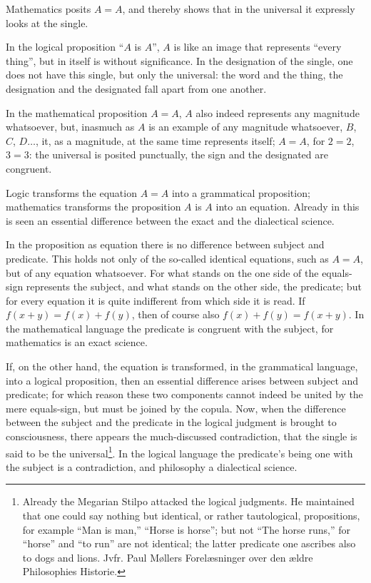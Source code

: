 \documentclass[12pt]{book}
\begin{document}
Mathematics posits $A = A$, and thereby shows that in the universal it expressly
looks at the single.

In the logical proposition ``$A$ is $A$'', $A$ is like an image that represents
``every thing'', but in itself is without significance. In the designation of the
single, one does not have this single, but only the universal: the word and the
thing, the designation and the designated fall apart from one another.

In the mathematical proposition $A = A$, $A$ also indeed represents any magnitude
whatsoever, but, inasmuch as $A$ is an example of any magnitude whatsoever, $B$,
$C$, $D\ldots$, it, as a magnitude, at the same time represents itself; $A = A$,
for $2 = 2$, $3 = 3$: the universal is posited punctually, the sign and the
designated are congruent.

Logic transforms the equation $A = A$ into a grammatical proposition;
mathematics transforms the proposition $A$ is $A$ into an equation. Already in
this is seen an essential difference between the exact and the dialectical
science.

In the proposition as equation there is no difference between subject and
predicate. This holds not only of the so-called identical equations, such as
$A = A$, but of any equation whatsoever. For what stands on the one side of the
equals-sign represents the subject, and what
stands on the other side, the predicate; but for every equation it is quite
indifferent from which side it is read. If $f(x+y) = f(x) + f(y)$, then of course
also $f(x) + f(y) = f(x+y)$. In the mathematical language the predicate is
congruent with the subject, for mathematics is an exact science.

If, on the other hand, the equation is transformed, in the grammatical language,
into a logical proposition, then an essential difference arises between subject
and predicate; for which reason these two components cannot indeed be united by
the mere equals-sign, but must be joined by the copula. Now, when the difference
between the subject and the predicate in the logical judgment is brought to
consciousness, there appears the much-discussed contradiction, that the single
is said to be the universal\footnote{Already the Megarian Stilpo attacked the
logical judgments. He maintained that one could say nothing but identical, or
rather tautological, propositions, for example ``Man is man,'' ``Horse is
horse''; but not ``The horse runs,'' for ``horse'' and ``to run'' are not
identical; the latter predicate one ascribes also to dogs and lions. Jvfr. Paul
Møllers Forelæsninger over den ældre Philosophies Historie.}. In the logical
language the predicate's being one with the subject is a contradiction, and
philosophy a dialectical science.
\end{document}
